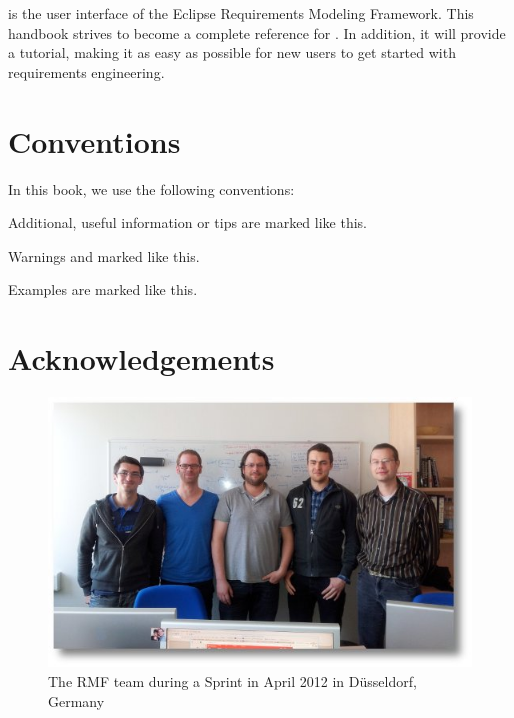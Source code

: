 \pror{} is the user interface of the Eclipse Requirements Modeling Framework.  This handbook strives to become a complete reference for \pror{}.  In addition, it will provide a tutorial, making it as easy as possible for new users to get started with requirements engineering.

\section{Conventions}

In this book, we use the following conventions:

\begin{info}
Additional, useful information or tips are marked like this.
\end{info}

\begin{warning}
Warnings and marked like this.
\end{warning}

\begin{example}
Examples are marked like this.
\end{example}


\section{Acknowledgements}

\begin{figure}
  \centering
  \includegraphics[width=\textwidth]{../rmf-images/2012_03_sprint_team.jpg}
  \caption{The RMF team during a Sprint in April 2012 in Düsseldorf, Germany}
  \label{fig:intro_core_team}
\end{figure}


